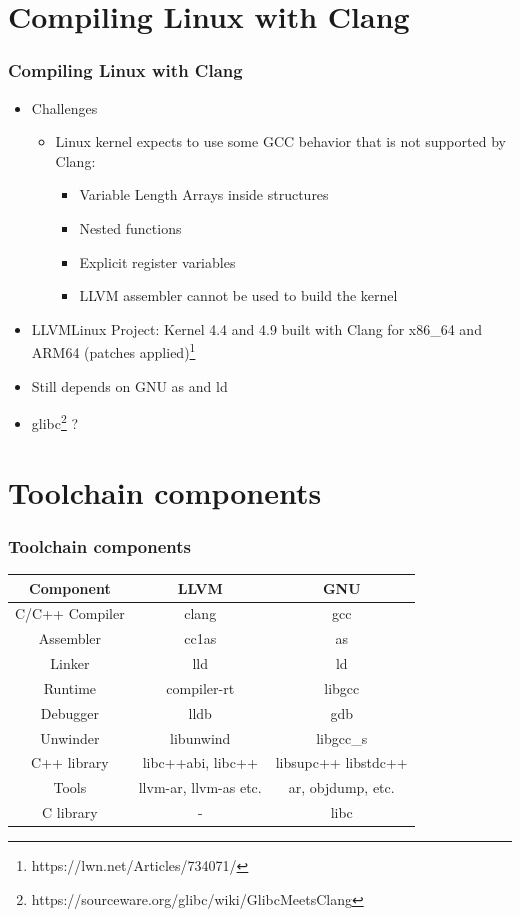 \documentclass{smilebeamer}
\begin{document}
\section{Compiling Linux with Clang}

\begin{frame}
\frametitle{Compiling Linux with Clang}
\begin{itemize}
  \item Challenges
  \begin{itemize}
    \item Linux kernel expects to use some GCC behavior that is not supported by Clang:
    \begin{itemize}
      \item Variable Length Arrays inside structures
      \item Nested functions
      \item Explicit register variables
      \item LLVM assembler cannot be used to build the kernel
    \end{itemize}
  \end{itemize}
  \item LLVMLinux Project: Kernel 4.4 and 4.9 built with Clang for x86\_64 and ARM64
  (patches applied)\footnote{https://lwn.net/Articles/734071/}
  \item Still depends on GNU {\selectfont as} and {\selectfont ld}
  \item glibc\footnote{https://sourceware.org/glibc/wiki/GlibcMeetsClang} ?
\end{itemize}
\end{frame}

\section{Toolchain components}
\begin{frame}
\frametitle{Toolchain components}
\centering
  \begin{tabular}{c|c|c}
  \textbf{Component} & \textbf{LLVM} & \textbf{GNU} \\
  \hline
  C/C++ Compiler & clang & gcc \\
  Assembler & cc1as & as \\
  Linker & lld & ld \\
  Runtime & compiler-rt & libgcc \\
  Debugger & lldb & gdb \\
  Unwinder & libunwind & libgcc\_s \\
  C++ library & libc++abi, libc++ & libsupc++ libstdc++ \\
  Tools & llvm-ar, llvm-as etc. & ar, objdump, etc. \\
  C library & - & libc \\
  \end{tabular}
\end{frame}
\end{document}
